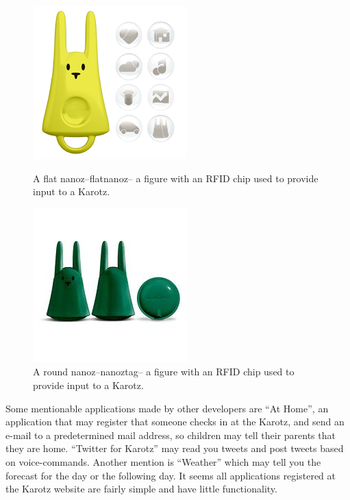 \begin{figure}
	\begin{minipage}[b]{0.4\linewidth}
		\centering
			\includegraphics[width=0.30\paperwidth]{Pictures/FlatnanozYellow}
		\caption[Flatnanoz]{A flat nanoz--flatnanoz-- a figure with an RFID chip used to provide input to a Karotz.}
		\label{fig:flatnanoz}
	\end{minipage}
	\hspace{3cm}
	\begin{minipage}[b]{0.4\linewidth}
		\centering
			\includegraphics[width=0.30\paperwidth]{Pictures/NanoztagGreen}
		\caption[Nanoztag]{A round nanoz--nanoztag-- a figure with an RFID chip used to provide input to a Karotz.}
		\label{fig:nanoztag}
	\end{minipage}
\end{figure}

Some mentionable applications made by other developers are 
``At Home'', an application that may register that someone checks 
in at the Karotz, and send an e-mail to a predetermined mail 
address, so children may tell their parents that they are home. 
``Twitter for Karotz'' may read you tweets and post tweets based 
on voice-commands. Another mention is ``Weather'' which may tell 
you the forecast for the day or the following day. It seems all 
applications registered at the Karotz website are fairly simple 
and have little functionality.

